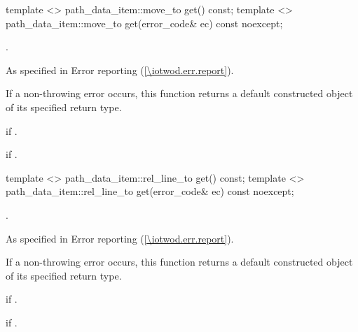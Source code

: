 \begin{itemdecl}
    template <>
    path_data_item::move_to get() const;
    template <>
    path_data_item::move_to get(error_code& ec) const noexcept;
\end{itemdecl}
\begin{itemdescr}
	\pnum
	\returns
	.
	
	\pnum
	\throws
	As specified in Error reporting (\ref{\iotwod.err.report}).
	
	\pnum
	\remarks
	If a non-throwing error occurs, this function returns a default constructed object of its specified return type.
	
	\pnum
	\errors
	 if .
	
	\pnum
	 if .

\end{itemdescr}

\begin{itemdecl}
    template <>
    path_data_item::rel_line_to get() const;
    template <>
    path_data_item::rel_line_to get(error_code& ec) const noexcept;
\end{itemdecl}
\begin{itemdescr}
	\pnum
	\returns
	.
	
	\pnum
	\throws
	As specified in Error reporting (\ref{\iotwod.err.report}).
	
	\pnum
	\remarks
	If a non-throwing error occurs, this function returns a default constructed object of its specified return type.
	
	\pnum
	\errors
	 if .
	
	\pnum
	 if .

\end{itemdescr}

